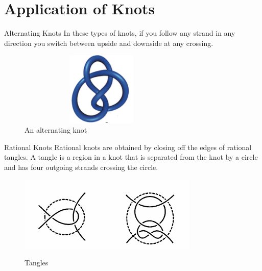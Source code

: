 \section{Application of Knots}
\begin{frame}{Alternating Knots}
	In these types of knots, if you follow any strand in any direction you switch between upside and downside at any crossing.
	\begin{figure}
		\centering
		\includegraphics[height = 3.5cm, width= 8cm]{images/realalterknot.png}
		\caption{An alternating knot}
		\label{alterknot}
	\end{figure}
	\cite{https://doi.org/10.1002/anie.201702531}
\end{frame}
\begin{frame}{Rational Knots}
	Rational knots are obtained by closing off the edges of rational tangles. A tangle is a region in a knot that is separated from the knot by a circle and has four outgoing strands crossing the circle. 
	\begin{figure}[h]
		\includegraphics[width=0.6\linewidth]{images/tangles.png}
		\caption{Tangles}
		\label{tangles}
		\cite{adams2004knot}
	\end{figure}
\end{frame}
